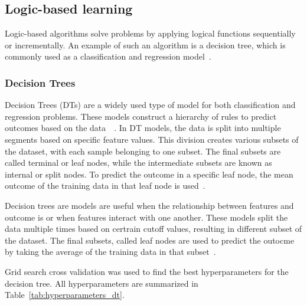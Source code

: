 \subsection{Logic-based learning}\label{subsec:logic-based-learning}

Logic-based algorithms solve problems by applying logical functions sequentially or
incrementally. An example of such an algorithm is a decision tree, which is commonly
used as a classification and regression model~\cite[p. 10]{dridi2021supervised}.

\subsubsection{Decision Trees}
Decision Trees (\ac{DT}s) are a widely used type of model for both classification and
regression problems. These models construct a hierarchy of rules to predict outcomes
based on the data~\cite[p. 70]{muller_introductionmachinelearning_2016}~\cite[p. 253]{
    shaik_briefsurveyrandom_2019}.
In \ac{DT} models, the data is split into multiple segments based on specific feature
values.
This division creates various subsets of the dataset, with each sample
belonging to one subset.
The final subsets are called terminal or leaf nodes, while the intermediate subsets are
known as internal or split nodes.
To predict the outcome in a specific leaf node, the mean outcome of the training data
in that leaf node is used~\cite[p. 70-72]{muller_introductionmachinelearning_2016}.

Decision trees are models are useful when the relationship between features
and outcome is
or when features interact with one another.
These models split the data multiple times based on certrain cutoff values,
resulting in different subset of the dataset.
The final subsets, called leaf nodes are used to predict the outocme by
taking the average of the training data in that subset~\cite[p. 76]{
    molnar2020interpretable}.

Grid search cross validation was used to find the best hyperparameters for
the decision tree.
All hyperparameters are summarized in Table~\ref{tab:hyperparameters_dt}.

